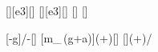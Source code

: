[\tonne][e3][\kg]
[\kilo\newton][e3][\newton]
[\kg]
[\mpss]

[-g]{\FTX/\mRX-\gX}[\mpss]
[m_\,(g+a)]{\mAsX*(\gX+\aX)}[\newton]
[]{(\gX+\aX)/\gX}
